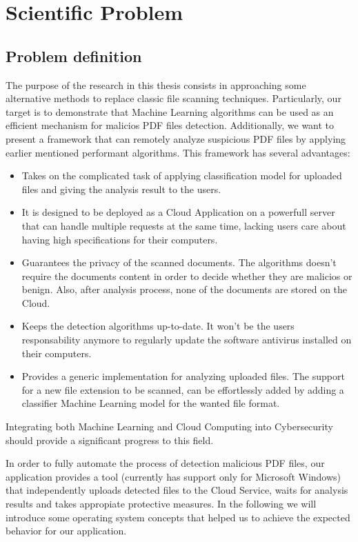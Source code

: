 \chapter{Scientific Problem}
\label{section:scientificProblem}

\section{Problem definition}
\label{section:problemDefinition}
The purpose of the research in this thesis consists in approaching some alternative methods to replace classic file scanning techniques. Particularly, our target is to demonstrate that Machine Learning algorithms can be used as an efficient mechanism for malicios PDF files detection. Additionally, we want to present a framework that can remotely analyze suspicious PDF files by applying earlier mentioned performant algorithms. This framework has several advantages: 
\begin{itemize}
    \item Takes on the complicated task of applying classification model for uploaded files and giving the analysis result to the users.
    \item It is designed to be deployed as a Cloud Application on a powerfull server that can handle multiple requests at the same time, lacking users care about having high specifications for their computers.
    \item Guarantees the privacy of the scanned documents. The algorithms doesn't require the documents content in order to decide whether they are malicios or benign. Also, after analysis process, none of the documents are stored on the Cloud.
    \item Keeps the detection algorithms up-to-date. It won't be the users responsability anymore to regularly update the software antivirus installed on their computers. 
    \item Provides a generic implementation for analyzing uploaded files. The support for a new file extension to be scanned, can be effortlessly added by adding a classifier Machine Learning model for the wanted file format.
\end{itemize}
Integrating both Machine Learning and Cloud Computing into Cybersecurity should provide a significant progress to this field. \par


In order to fully automate the process of detection malicious PDF files, our application provides a tool (currently has support only for Microsoft Windows) that independently uploads detected files to the Cloud Service, waits for analysis results and takes appropiate protective measures. In the following we will introduce some operating system concepts that helped us to achieve the expected behavior for our application.

